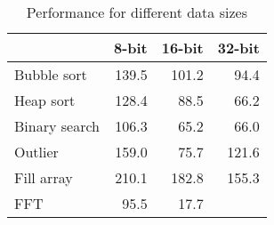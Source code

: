\begin{table}
\caption{Performance for different data sizes}
\label{tbl-performance-8-16-32-bit}
    \begin{tabular}{lrrr} %
    \toprule
                   &   8-bit  &  16-bit  &     32-bit \\
    \midrule
    \midrule
    Bubble sort    &    139.5 &    101.2 &       94.4 \\
    Heap sort      &    128.4 &     88.5 &       66.2 \\
    Binary search  &    106.3 &     65.2 &       66.0 \\
    Outlier        &    159.0 &     75.7 &      121.6 \\
    Fill array     &    210.1 &    182.8 &      155.3 \\
    FFT            &     95.5 &     17.7 &            \\
    \bottomrule
    \end{tabular}
\end{table}

